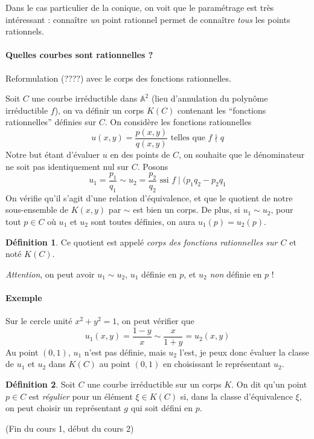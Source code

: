 \documentclass[a4paper, 11pt]{article}
\theoremstyle{definition}
\newtheorem{définition}{Définition}
\newcommand{\aff}{\mathbb{A}}
\begin{document}
Dans le cas particulier de la conique, on voit que le paramétrage est
très intéressant : connaître \emph{un} point rationnel permet de
connaître \emph{tous} les points rationnels.

\paragraph{Quelles courbes sont rationnelles ?} Reformulation (????)
avec le corps des fonctions rationnelles.

Soit $C$ une courbe irréductible dans $\aff^2$ (lieu d'annulation du
polynôme irréductible $f$), on va définir un corps $K(C)$ contenant
les \enquote{fonctions rationnelles} définies sur $C$. On considère
les fonctions rationnelles
\[ u(x,y) = \frac{p(x,y)}{q(x,y)} \text{ telles que } f \nmid q \]
Notre but étant d'évaluer $u$ en des points de $C$, on souhaite que le
dénominateur ne soit pas identiquement nul sur $C$. Posons
\[ u_1 = \frac{p_1}{q_1} \sim u_2 = \frac{p_2}{q_2} \text{ ssi } f
\mid (p_1q_2 - p_2q_1 \]
On vérifie qu'il s'agit d'une relation d'équivalence, et que le
quotient de notre sous-ensemble de $K(x,y)$ par $\sim$ est bien un
corps. De plus, si $u_1 \sim u_2$, pour tout $p \in C$ où $u_1$ et
$u_2$ sont toutes définies, on aura $u_1(p) = u_2(p)$.
\begin{définition}
  Ce quotient est appelé \emph{corps des fonctions rationnelles sur
    $C$} et noté $K(C)$.
\end{définition}
\emph{Attention}, on peut avoir $u_1 \sim u_2$, $u_1$ définie en $p$,
et $u_2$ \emph{non} définie en $p$ !

\paragraph{Exemple} Sur le cercle unité $x^2 + y^2 = 1$, on peut
vérifier que
\[ u_1(x,y) = \frac{1-y}{x} \sim \frac{x}{1+y} = u_2(x,y) \]
Au point $(0,1)$, $u_1$ n'est pas définie, mais $u_2$ l'est, je peux
donc évaluer la classe de $u_1$ et $u_2$ dans $K(C)$ au point $(0,1)$
en choisissant le représentant $u_2$.

\begin{définition}
  Soit $C$ une courbe irréductible sur un corps $K$. On dit qu'un point
  $p \in C$ est \emph{régulier} pour un élément $\xi \in K(C)$ si,
  dans la classe d'équivalence $\xi$, on peut choisir un représentant
  $g$ qui soit défini en $p$.
\end{définition}

(Fin du cours 1, début du cours 2)
\end{document}
